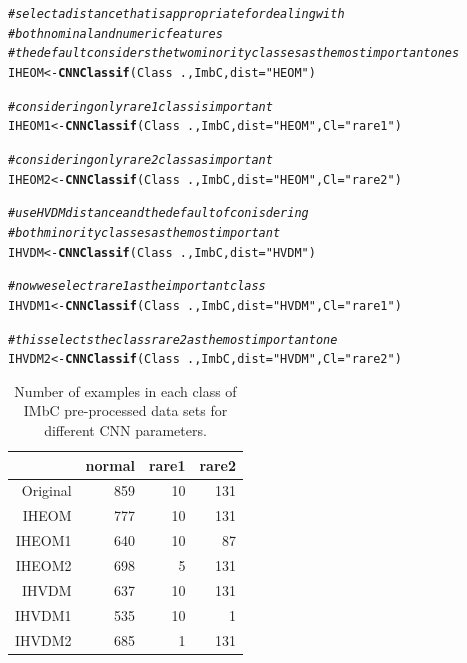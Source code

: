 \documentclass[10pt,a4paper]{article}\usepackage[]{graphicx}\usepackage[]{color}
\makeatletter
\newcommand{\hlstr}[1]{\textcolor[rgb]{0.192,0.494,0.8}{#1}}%
\newcommand{\hlcom}[1]{\textcolor[rgb]{0.678,0.584,0.686}{\textit{#1}}}%
\newcommand{\hlopt}[1]{\textcolor[rgb]{0,0,0}{#1}}%
\newcommand{\hlstd}[1]{\textcolor[rgb]{0.345,0.345,0.345}{#1}}%
\newcommand{\hlkwb}[1]{\textcolor[rgb]{0.69,0.353,0.396}{#1}}%
\newcommand{\hlkwc}[1]{\textcolor[rgb]{0.333,0.667,0.333}{#1}}%
\newcommand{\hlkwd}[1]{\textcolor[rgb]{0.737,0.353,0.396}{\textbf{#1}}}%
\newenvironment{kframe}{%
 \def\at@end@of@kframe{}%
 \ifinner\ifhmode%
  \def\at@end@of@kframe{\end{minipage}}%
  \begin{minipage}{\columnwidth}%
 \fi\fi%
 \def\FrameCommand##1{\hskip\@totalleftmargin \hskip-\fboxsep
 \colorbox{shadecolor}{##1}\hskip-\fboxsep
     \hskip-\linewidth \hskip-\@totalleftmargin \hskip\columnwidth}%
 \MakeFramed {\advance\hsize-\width
   \@totalleftmargin\z@ \linewidth\hsize
   \@setminipage}}%
 {\par\unskip\endMakeFramed%
 \at@end@of@kframe}
\newenvironment{knitrout}{}{} %
\makeatother
\begin{document}
\begin{knitrout}\footnotesize
{}\color{fgcolor}\begin{kframe}
\begin{alltt}
\hlcom{# select a distance that is appropriate for dealing with}
\hlcom{# both nominal and numeric features}
\hlcom{# the default considers the two minority classes as the most important ones}
\hlstd{IHEOM} \hlkwb{<-} \hlkwd{CNNClassif}\hlstd{(Class}\hlopt{~}\hlstd{., ImbC,} \hlkwc{dist}\hlstd{=}\hlstr{"HEOM"}\hlstd{)}

\hlcom{# considering only rare1 class is important}
\hlstd{IHEOM1} \hlkwb{<-} \hlkwd{CNNClassif}\hlstd{(Class}\hlopt{~}\hlstd{., ImbC,} \hlkwc{dist}\hlstd{=}\hlstr{"HEOM"}\hlstd{,} \hlkwc{Cl}\hlstd{=}\hlstr{"rare1"}\hlstd{)}

\hlcom{# considering only rare2 class as important}
\hlstd{IHEOM2} \hlkwb{<-} \hlkwd{CNNClassif}\hlstd{(Class}\hlopt{~}\hlstd{., ImbC,} \hlkwc{dist}\hlstd{=}\hlstr{"HEOM"}\hlstd{,} \hlkwc{Cl}\hlstd{=}\hlstr{"rare2"}\hlstd{)}

\hlcom{# use HVDM distance and the default of conisdering }
\hlcom{# both minority classes as the most important}
\hlstd{IHVDM} \hlkwb{<-} \hlkwd{CNNClassif}\hlstd{(Class}\hlopt{~}\hlstd{., ImbC,} \hlkwc{dist}\hlstd{=}\hlstr{"HVDM"}\hlstd{)}

\hlcom{# now we select rare1 as the important class}
\hlstd{IHVDM1} \hlkwb{<-} \hlkwd{CNNClassif}\hlstd{(Class}\hlopt{~}\hlstd{., ImbC,} \hlkwc{dist}\hlstd{=}\hlstr{"HVDM"}\hlstd{,} \hlkwc{Cl}\hlstd{=}\hlstr{"rare1"}\hlstd{)}

\hlcom{# this selects the class rare2 as the most important one}
\hlstd{IHVDM2} \hlkwb{<-} \hlkwd{CNNClassif}\hlstd{(Class}\hlopt{~}\hlstd{., ImbC,} \hlkwc{dist}\hlstd{=}\hlstr{"HVDM"}\hlstd{,} \hlkwc{Cl}\hlstd{=}\hlstr{"rare2"}\hlstd{)}
\end{alltt}
\end{kframe}
\end{knitrout}

\begin{table}[ht]
\centering
\begin{tabular}{rrrr}
  \hline
 & normal & rare1 & rare2 \\ 
  \hline
Original & 859 &  10 & 131 \\ 
  IHEOM & 777 &  10 & 131 \\ 
  IHEOM1 & 640 &  10 &  87 \\ 
  IHEOM2 & 698 &   5 & 131 \\ 
  IHVDM & 637 &  10 & 131 \\ 
  IHVDM1 & 535 &  10 &   1 \\ 
  IHVDM2 & 685 &   1 & 131 \\ 
   \hline
\end{tabular}
\caption{Number of examples in each class of IMbC pre-processed data sets for different CNN parameters.} 
\label{tab:ImbC_CNN_table}
\end{table}
\end{document}
